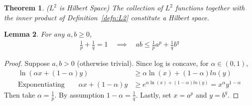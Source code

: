 \documentclass[12pt]{article}
\theoremstyle{plain}
\newtheorem{thm}{Theorem}[section]
\newtheorem{lem}[thm]{Lemma}
\theoremstyle{definition}
\theoremstyle{remark}
\begin{document}
\begin{thm}\emph{($L^2$ is Hilbert Space)}
The collection of $L^2$ functions together with the inner product of
Definition~\ref{defn:L2} constitute a Hilbert space.
\end{thm}

\begin{lem}
\label{lem:holder}
For any $a,b\geq 0$,
\begin{align*}
  \frac{1}{p}+\frac{1}{q}=1
  \quad\implies\quad
  ab
  \leq
  \frac{1}{p} a^p + \frac{1}{q} b^q
\end{align*}
\end{lem}
\begin{proof}
Suppose $a,b>0$ (otherwise trivial).
Since log is concave, for $\alpha\in(0,1)$,
\begin{align*}
  \ln(\alpha x + (1-\alpha)y)
  &\geq
  \alpha \ln(x) + (1-\alpha)ln(y) \\
  \text{Exponentiating} \qquad
  \alpha x + (1-\alpha)y
  &\geq
  e^{\alpha \ln(x) + (1-\alpha)ln(y)}
  = x^\alpha y^{1-\alpha}
\end{align*}
Then take $\alpha =\frac{1}{p}$. By assumption $1-\alpha=\frac{1}{q}$.
Lastly, set $x=a^p$ and $y=b^q$.
\end{proof}
\end{document}
